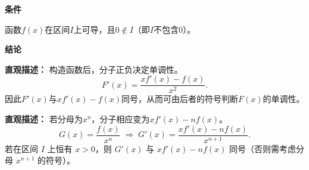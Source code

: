 \begin{statementbox}
	\textbf{\textcolor{CStatement}{条件}}
	\begin{description}[style=nextline, leftmargin=2.8em, labelsep=0.5em, itemsep=0.35em]
		\item[\textbf{\textcolor{CStatement}{条件1（定义域限制）：}}]
			函数$f(x)$在区间$I$上可导，且$0\notin I$（即$I$不包含$0$）。
	\end{description}
	\par
	\textbf{\textcolor{CStatement}{结论}}
	\begin{description}[style=nextline, leftmargin=2.8em, labelsep=0.5em, itemsep=0.45em]
		\item[\textbf{\textcolor{CStatement}{结论一（核心构造）：}}]
			\textbf{\textcolor{CStatement}{直观描述：}}
			构造函数后，分子正负决定单调性。
			\[
				F'(x)=\frac{x f'(x)-f(x)}{x^{2}}.
			\]
			因此$F'(x)$与$x f'(x)-f(x)$同号，从而可由后者的符号判断$F(x)$的单调性。
		\item[\textbf{\textcolor{CStatement}{常见变形（幂次推广）：}}]
			\textbf{\textcolor{CStatement}{直观描述：}}
			若分母为$x^{n}$，分子相应变为$x f'(x)-n f(x)$。
			\[
				G(x)=\frac{f(x)}{x^{n}}\;\Rightarrow\; G'(x)=\frac{x f'(x)-n f(x)}{x^{n+1}}.
			\]
			若在区间 $I$ 上恒有 $x>0$，则 $G'(x)$ 与 $x f'(x)-n f(x)$ 同号（否则需考虑分母 $x^{n+1}$ 的符号）。
	\end{description}

\end{statementbox}
